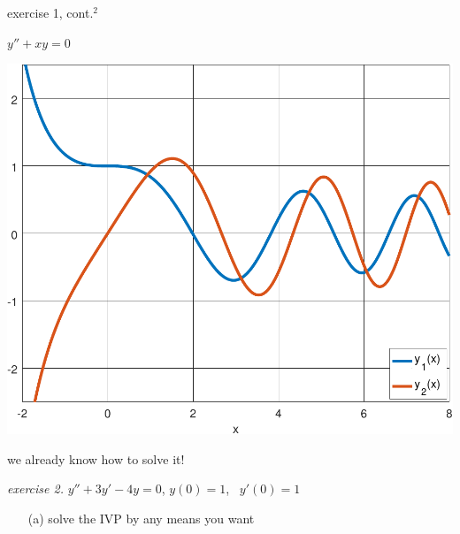 \documentclass[dvipsnames,colorlinks]{beamer}
\begin{document}
\begin{frame}{exercise 1, cont.$^2$}
\begin{center}
\begin{minipage}[t]{0.3\textwidth} \vspace{0mm} $y''+xy=0$\end{minipage}
\qquad\quad
\begin{minipage}[t]{0.55\textwidth} \vspace{-3mm} \includegraphics[width=\textwidth]{figs/airyplots} \end{minipage}
\end{center}
\end{frame}


\begin{frame}{we already know how to solve it!}

\noindent \emph{exercise 2.}  \qquad $y''+3y'-4y=0$, \quad $y(0)=1$, \, $y'(0)=1$

\begin{itemize}
\item[(a)] solve the IVP by any means you want
\end{itemize}

\vspace{50mm}
\end{frame}
\end{document}
